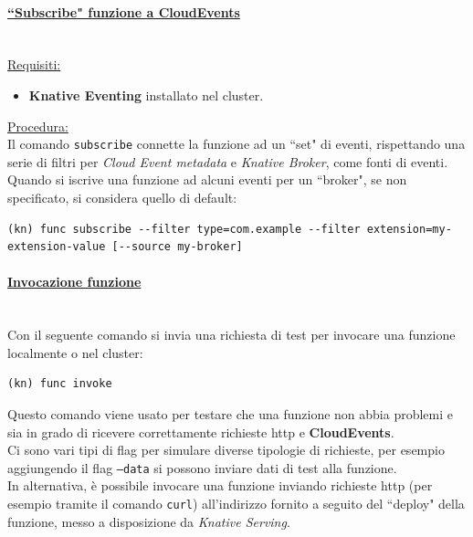\documentclass[12pt,a4paper,openany,twoside]{book}
\begin{document}
\paragraph{\underline{``Subscribe" funzione a CloudEvents}} ~\\
\underline{Requisiti:}
\begin{itemize}
    \item \textbf{Knative Eventing} installato nel cluster.
\end{itemize}

\noindent
\underline{Procedura:}
\\
Il comando \texttt{subscribe} connette la funzione ad un ``set" di eventi, rispettando una serie di filtri per \textit{Cloud Event metadata} e \textit{Knative Broker}, come fonti di eventi.
\\
Quando si iscrive una funzione ad alcuni eventi per un ``broker", se non specificato, si considera quello di default:
\begin{lstlisting}
(kn) func subscribe --filter type=com.example --filter extension=my-extension-value [--source my-broker]\end{lstlisting}

\paragraph{\underline{Invocazione funzione}} ~\\
Con il seguente comando si invia una richiesta di test per invocare una funzione localmente o nel cluster: \begin{lstlisting}
(kn) func invoke\end{lstlisting}

\noindent
Questo comando viene usato per testare che una funzione non abbia problemi e sia in grado di ricevere correttamente richieste \ac{http} e \textbf{CloudEvents}.
\\
Ci sono vari tipi di flag per simulare diverse tipologie di richieste, per esempio aggiungendo il flag \texttt{--data} si possono inviare dati di test alla funzione.
\\
In alternativa, è possibile invocare una funzione inviando richieste \ac{http} (per esempio tramite il comando \texttt{curl}) all'indirizzo fornito a seguito del ``deploy" della funzione, messo a disposizione da \textit{Knative Serving}.


%
\end{document}
